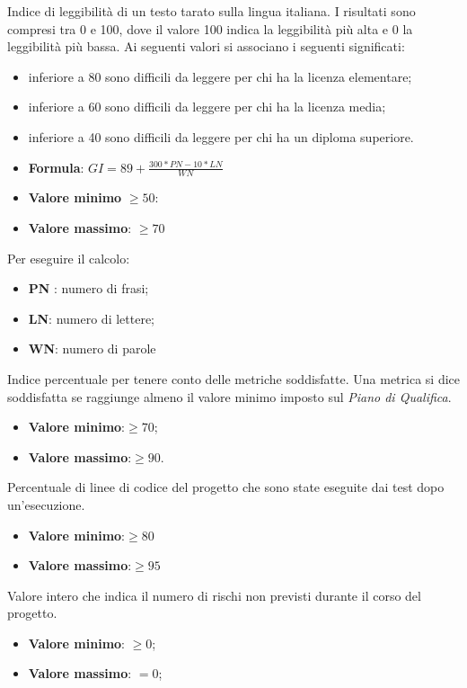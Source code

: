 Indice di leggibilità di un testo tarato sulla lingua italiana. I risultati sono compresi tra 0 e
100, dove il valore 100 indica la leggibilità più alta e 0 la leggibilità più bassa. Ai seguenti valori si
associano i seguenti significati:
\begin{itemize}
    \item inferiore a 80 sono difficili da leggere per chi ha la licenza elementare;
    \item inferiore a 60 sono difficili da leggere per chi ha la licenza media;
    \item inferiore a 40 sono difficili da leggere per chi ha un diploma superiore.
\end{itemize}
\begin{itemize}
    \item \textbf{Formula}: $GI=89+\frac{300*PN-10*LN}{WN}$
    \item \textbf{Valore minimo} $\geq50$:
    \item \textbf{Valore massimo}: $\geq70$
\end{itemize}  
Per eseguire il calcolo:
\begin{itemize}
    \item \textbf{PN} : numero di frasi;
    \item \textbf{LN}: numero di lettere;
    \item \textbf{WN}: numero di parole
\end{itemize}

Indice percentuale per tenere conto delle metriche soddisfatte. Una
metrica si dice soddisfatta se raggiunge almeno il valore minimo imposto sul \textit{Piano di Qualifica}.
\begin{itemize}
    \item \textbf{Valore minimo}:$\geq70$;
    \item \textbf{Valore massimo}:$\geq90$.
\end{itemize}  

Percentuale di linee di codice del progetto che sono state eseguite dai test dopo
un’esecuzione.
\begin{itemize}
    \item \textbf{Valore minimo}:$\geq80$
    \item \textbf{Valore massimo}:$\geq95$
\end{itemize}  


Valore intero che indica il numero di rischi non previsti durante il corso del progetto.
\begin{itemize}
    \item \textbf{Valore minimo}: $\geq0$;
    \item \textbf{Valore massimo}: $=0$;
\end{itemize}  



